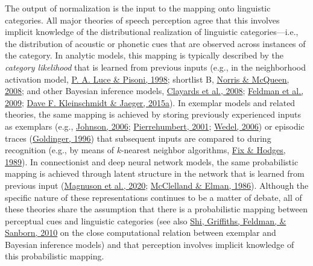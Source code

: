 \documentclass[
  11pt,
  english,
  man,floatsintext]{apa6}
\begin{document}
The output of normalization is the input to the mapping onto linguistic categories. All major theories of speech perception agree that this involves implicit knowledge of the distributional realization of linguistic categories---i.e., the distribution of acoustic or phonetic cues that are observed across instances of the category. In analytic models, this mapping is typically described by the \emph{category likelihood} that is learned from previous inputs (e.g., in the neighborhood activation model, \protect\hyperlink{ref-luce-pisoni1998}{P. A. Luce \& Pisoni, 1998}; shortlist B, \protect\hyperlink{ref-norris-mcqueen2008}{Norris \& McQueen, 2008}; and other Bayesian inference models, \protect\hyperlink{ref-clayards2008}{Clayards et al., 2008}; \protect\hyperlink{ref-feldman2009}{Feldman et al., 2009}; \protect\hyperlink{ref-kleinschmidt-jaeger2015}{Dave F. Kleinschmidt \& Jaeger, 2015a}). In exemplar models and related theories, the same mapping is achieved by storing previously experienced inputs as exemplars (e.g., \protect\hyperlink{ref-johnson2006}{Johnson, 2006}; \protect\hyperlink{ref-pierrehumbert2001}{Pierrehumbert, 2001}; \protect\hyperlink{ref-wedel2006}{Wedel, 2006}) or episodic traces (\protect\hyperlink{ref-goldinger1996}{Goldinger, 1996}) that subsequent inputs are compared to during recognition (e.g., by means of \(k\)-nearest neighbor algorithms, \protect\hyperlink{ref-fix-hodges1989}{Fix \& Hodges, 1989}). In connectionist and deep neural network models, the same probabilistic mapping is achieved through latent structure in the network that is learned from previous input (\protect\hyperlink{ref-magnuson2020}{Magnuson et al., 2020}; \protect\hyperlink{ref-mcclelland-elman1986}{McClelland \& Elman, 1986}). Although the specific nature of these representations continues to be a matter of debate, all of these theories share the assumption that there is a probabilistic mapping between perceptual cues and linguistic categories (see also \protect\hyperlink{ref-shi2010}{Shi, Griffiths, Feldman, \& Sanborn, 2010} on the close computational relation between exemplar and Bayesian inference models) and that perception involves implicit knowledge of this probabilistic mapping.
\end{document}
